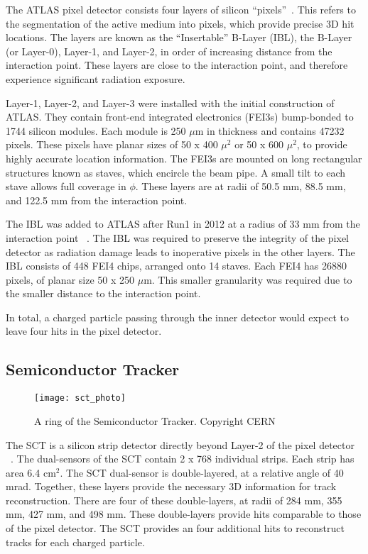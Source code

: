The ATLAS pixel detector consists four layers of silicon ``pixels''~\cite{Aad:2008zz}.
This refers to the segmentation of the active medium into pixels, which provide precise 3D hit locations.
The layers are known as the ``Insertable'' B-Layer (IBL), the B-Layer (or Layer-0), Layer-1, and Layer-2, in order of increasing distance from the interaction point.
These layers are close to the interaction point, and therefore experience significant radiation exposure.

Layer-1, Layer-2, and Layer-3 were installed with the initial construction of ATLAS.
They contain front-end integrated electronics (FEI3s) bump-bonded to 1744 silicon modules.
Each module is 250 $\mu$m in thickness and contains 47232 pixels.
These pixels have planar sizes of 50 x 400 $\mu^2$ or  50 x 600 $\mu^2$, to provide highly accurate location information.
The FEI3s are mounted on long rectangular structures known as staves, which encircle the beam pipe.
A small tilt to each stave allows full coverage in $\phi$.
These layers are at radii of 50.5 mm, 88.5 mm, and 122.5 mm from the interaction point.

The IBL was added to ATLAS after Run1 in 2012 at a radius of 33 mm from the interaction point ~\cite{B-layerRef}.
The IBL was required to preserve the integrity of the pixel detector as radiation damage leads to inoperative pixels in the other layers.
The IBL consists of 448 FEI4 chips, arranged onto 14 staves.
Each FEI4 has 26880 pixels, of planar size 50 x 250 $\mu$m.
This smaller granularity was required due to the smaller distance to the interaction point.

In total, a charged particle passing through the inner detector would expect to leave four hits in the pixel detector.

\subsection{Semiconductor Tracker}
\begin{figure}[tbp]
\caption{A ring of the Semiconductor Tracker. Copyright CERN} \label{fig:sct_photo}
\texttt{[image: sct\_photo]}
\end{figure}

The SCT is a silicon strip detector directly beyond Layer-2 of the pixel detector ~\cite{IDET-2013-01}.
The dual-sensors of the SCT contain 2 x 768 individual strips.
Each strip has area 6.4 cm$^2$.
The SCT dual-sensor is double-layered, at a relative angle of 40 mrad.
Together, these layers provide the necessary 3D information for track reconstruction.
There are four of these double-layers, at radii of 284 mm, 355 mm, 427 mm, and 498 mm.
These double-layers provide hits comparable to those of the pixel detector.
The SCT provides an four additional hits to reconstruct tracks for each charged particle.

